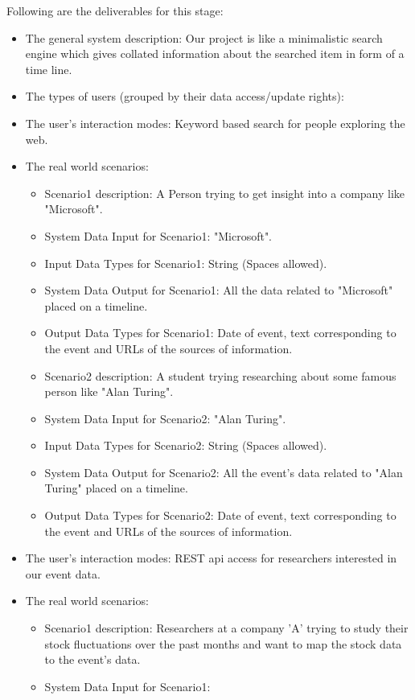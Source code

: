 Following are the deliverables for this stage:

\begin{itemize} 
\item{The general system description: } 
Our project is like a minimalistic search engine which gives collated information about the searched item in form of a time line.
\item{The types of users (grouped by their data access/update rights): }
\item{The user's interaction modes: }
Keyword based search for people exploring the web.
\item{The real world scenarios: }
	\begin{itemize} 
	\item{Scenario1 description: }
	A Person trying to get insight into a company like "Microsoft".
	\item{System Data Input for Scenario1: }
	"Microsoft".
	\item{Input Data Types for Scenario1: }
	String (Spaces allowed).
	\item{System Data Output for Scenario1: }
	All the data related to "Microsoft" placed on a timeline.
	\item{Output Data Types for Scenario1: }
	Date of event, text corresponding to the event and URLs of the sources of information.
	\item{Scenario2 description: }
	A student trying researching about some famous person like "Alan Turing".
	\item{System Data Input for Scenario2: }
	"Alan Turing".
	\item{Input Data Types for Scenario2: }
	String (Spaces allowed).
	\item{System Data Output for Scenario2: }
	All the event's data related to "Alan Turing" placed on a timeline.
	\item{Output Data Types for Scenario2: }
	Date of event, text corresponding to the event and URLs of the sources of information.
	\end{itemize}
\item{The user's interaction modes: }
REST api access for researchers interested in our event data.
\item{The real world scenarios: }
	\begin{itemize} 
	\item{Scenario1 description: }
	Researchers at a company 'A' trying to study their stock fluctuations over the past months and want to map the stock data to the event's data.
	\item{System Data Input for Scenario1: }

\end{itemize}
\end{itemize}
